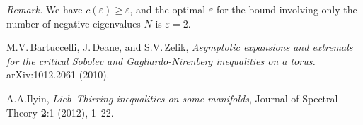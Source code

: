 \documentclass[10pt,a4paper]{article}
\begin{document}
\medskip
\noindent
{\it Remark.} We have  $c(\varepsilon)\ge\varepsilon$, and the optimal
$\varepsilon$ for the
bound involving only the number of negative eigenvalues $N$
is $\varepsilon=2$.




\begin{thebibliography}{7}



M.V.\,Bartuccelli, J.\,Deane, and
S.V.\,Zelik, \emph{Asymptotic expansions and extremals for
the critical Sobolev and Gagliardo-Nirenberg inequalities on a
torus.} arXiv:1012.2061 (2010).

 A.A.Ilyin,
\emph{Lieb--Thirring inequalities on some manifolds}, Journal
of Spectral Theory
\textbf{2}:1 (2012), 1--22.

\end{thebibliography}
\end{document}
